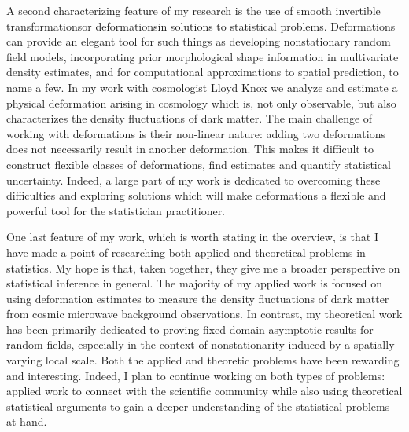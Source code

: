 \documentclass[12pt]{article}
\begin{document}
 A second characterizing feature of my research is the use of smooth invertible transformations\textemdash or deformations\textemdash in solutions to statistical problems. Deformations can provide an elegant tool  for  such things as developing nonstationary random field models, incorporating prior morphological shape information in multivariate density estimates, and for
 computational approximations to spatial prediction, to name a few. In my work with cosmologist Lloyd Knox we analyze and estimate a physical deformation arising in cosmology which is, not only observable, but also characterizes the density fluctuations of dark matter.
 The main challenge of working with deformations  is their non-linear nature: adding two deformations does not necessarily result in another deformation.  This makes it difficult to construct flexible classes of deformations, find estimates and quantify statistical uncertainty. Indeed, a large part of my work is dedicated to overcoming these difficulties and exploring solutions which will make deformations a flexible and powerful tool for the statistician practitioner.



 One last feature of my work, which is worth stating in the overview, is that I have made a point of researching both applied and theoretical problems in statistics.  My hope is that, taken together, they give me a broader perspective on statistical inference in general.
 The majority of my applied work is focused on using deformation estimates to measure the density fluctuations of dark matter from cosmic microwave background observations.
  In contrast, my theoretical work has been primarily dedicated to proving fixed domain asymptotic results for random fields, especially in the context of nonstationarity induced by a spatially varying local scale.
Both the applied and theoretic problems have been rewarding and interesting.
Indeed, I plan to continue working on both types of problems: applied work to connect with the scientific community  while also using theoretical statistical arguments to gain a deeper  understanding of the statistical problems at hand.
\end{document}
